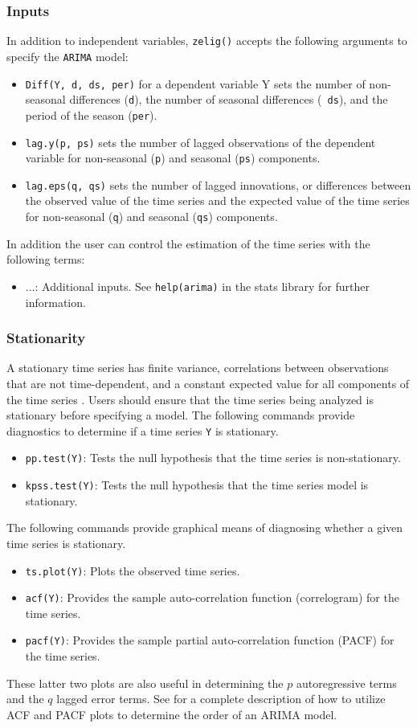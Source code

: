 \subsubsection*{Inputs}
In addition to independent variables, {\tt zelig()} accepts the
following arguments to specify the {\tt ARIMA} model:
\begin{itemize}
\item {\tt Diff(Y, d, ds, per)} for a dependent variable Y sets the
number of non-seasonal differences ({\tt d}), the number of seasonal differences ({\tt
ds}), and the period of the season ({\tt per}).
\item {\tt lag.y(p, ps)} sets the number of lagged observations of the
dependent variable for non-seasonal ({\tt p}) and seasonal ({\tt ps})
components.
\item {\tt lag.eps(q, qs)} sets the number of lagged innovations, or
differences between the observed value of the time series and the
expected value of the time series for non-seasonal ({\tt q}) and
seasonal ({\tt qs}) components.  
\end{itemize}
In addition the user can control the estimation of the time
series with the following terms: 
\begin{itemize}
\item $\hdots$: Additional inputs.  See {\tt help(arima)} in the stats
library for further information.
\end{itemize}

\subsubsection*{Stationarity}
A stationary time series has finite variance, correlations between
observations that are not time-dependent, and a constant expected
value for all components of the time series \citep[p.\ 12]{BroDav91}.
Users should ensure that the time series being analyzed is stationary
before specifying a model.  The following commands provide diagnostics
to determine if a time series {\tt Y} is stationary.
\begin{itemize}
\item {\tt pp.test(Y)}: Tests the null hypothesis that the time series
  is non-stationary.  
\item {\tt kpss.test(Y)}: Tests the null hypothesis that the time
  series model is stationary.
\end{itemize}  
The following commands provide graphical means of diagnosing whether a
given time series is stationary.  
\begin{itemize}
\item {\tt ts.plot(Y)}: Plots the observed time series.  
\item {\tt acf(Y)}: Provides the sample auto-correlation function
(correlogram) for the time series.
\item {\tt pacf(Y)}: Provides the sample partial auto-correlation
  function (PACF) for the time series. 
\end{itemize}
These latter two plots are also useful in determining the $p$
autoregressive terms and the $q$ lagged error terms.  See
\cite{Enders04} for a complete description of how to utilize ACF and
PACF plots to determine the order of an ARIMA model.


